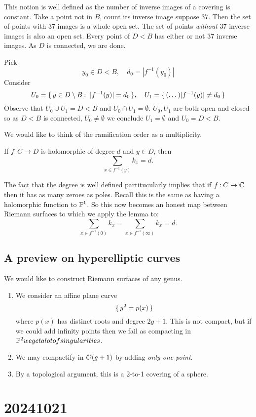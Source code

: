 \documentclass[12pt]{memoir}
\begin{document}
This notion is well defined as the number of inverse images of a covering is constant. Take a point not in $B$, count its inverse image suppose 37. Then the set of points with 37 images is a whole open set. The set of points \emph{without} 37 inverse images is also an open set. Every point of $D\less B$ has either or not 37 inverse images. As $D$ is connected, we are done.\par
Pick 
$$y_0\in D\less B,\quad d_0=|f^{-1}(y_0)|$$
Consider 
$$U_0=\set{y\in D\less B\:\ |f^{-1}(y)|=d_0},\quad U_1=\set{(\dots)|f^{-1}(y)|\neq d_0}$$
Observe that $U_0\cup U_1= D\less B$ and $U_0\cap U_1=\emptyset$. $U_0,U_1$ are both open and closed so as $D\less B$ is connected, $U_0\neq \emptyset$ we conclude $U_1=\emptyset$ and $U_0=D\less B$.\par
We would like to think of the ramification order as a multiplicity.

\begin{Lem}
    If $f\:\ C\to D$ is holomorphic of degree $d$ and $y\in D$, then
$$\sum_{x\in f^{-1}(y)}k_x=d.$$
\end{Lem}

The fact that the degree is well defined partitucularly implies that if $f\mathbin{:} C\to \mathbb{C}$ then it has as many zeroes as poles. Recall this is the same as having a holomorphic function to $\mathbb{P}^1$. So this now becomes an honest map between Riemann surfaces to which we apply the lemma to:
$$\sum_{x\in f^{-1}(0)}k_x=\sum_{x\in f^{-1}(\infty)}k_x=d.$$

\subsection{A preview on hyperelliptic curves}

We would like to construct Riemann surfaces of any genus. 

\begin{enumerate}
    \item We consider an affine plane curve
    $$\{\,y^2=p(x)\,\}$$
    where $p(x)$ has distinct roots and degree $2g+1$. This is not compact, but if we could add infinity points then we fail as compacting in $\mathbb{P}^2 we get a lot of singularities$.
    \item We may compactify in $\mathcal{O}(g+1)$ by adding \emph{only one point}.
    \item By a topological argument, this is a 2-to-1 covering of a sphere.
\end{enumerate}

\section{20241021}
\end{document}
